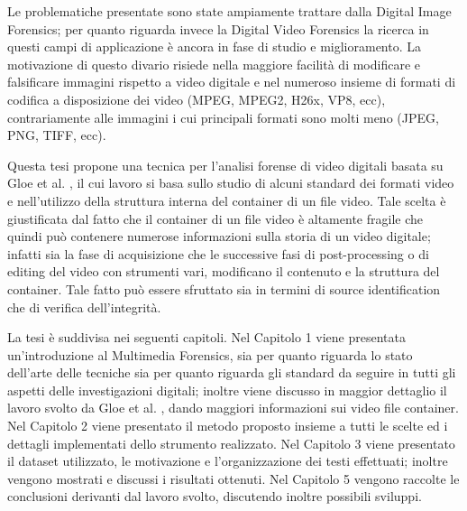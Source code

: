 Le problematiche presentate sono state ampiamente trattare dalla Digital Image Forensics; per quanto riguarda invece la Digital Video Forensics la ricerca in questi campi di applicazione è ancora in fase di studio e miglioramento. La motivazione di questo divario risiede nella maggiore facilità di modificare e falsificare immagini rispetto a video digitale e nel numeroso insieme di formati di codifica a disposizione dei video (MPEG, MPEG2, H26x, VP8, ecc), contrariamente alle immagini i cui principali formati sono molti meno (JPEG, PNG, TIFF, ecc).

Questa tesi propone una tecnica per l'analisi forense di video digitali basata su Gloe et al. \cite{Gloe2014S68}, il cui lavoro si basa sullo studio di alcuni standard dei formati video e nell'utilizzo della struttura interna del container di un file video. Tale scelta è giustificata dal fatto che il container di un file video è altamente fragile che quindi può contenere numerose informazioni sulla storia di un video digitale; infatti sia la fase di acquisizione che le successive fasi di post-processing o di editing del video con strumenti vari, modificano il contenuto e la struttura del container. Tale fatto può essere sfruttato sia in termini di source identification che di verifica dell'integrità.

La tesi è suddivisa nei seguenti capitoli. Nel Capitolo 1 viene presentata un'introduzione al Multimedia Forensics, sia per quanto riguarda lo stato dell'arte delle tecniche sia per quanto riguarda gli standard da seguire in tutti gli aspetti delle investigazioni digitali; inoltre viene discusso in maggior dettaglio il lavoro svolto da Gloe et al. \cite{Gloe2014S68}, dando maggiori informazioni sui video file container. Nel Capitolo 2 viene presentato il metodo proposto insieme a tutti le scelte ed i dettagli implementati dello strumento realizzato. Nel Capitolo 3 viene presentato il dataset utilizzato, le motivazione e l'organizzazione dei testi effettuati; inoltre vengono mostrati e discussi i risultati ottenuti. Nel Capitolo 5 vengono raccolte le conclusioni derivanti dal lavoro svolto, discutendo inoltre possibili sviluppi.
